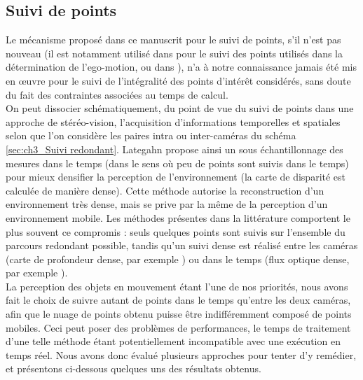 \subsection{Suivi de points} \label{sec:ch3_Implémentation}
Le mécanisme proposé dans ce manuscrit pour le suivi de points, s'il n'est pas nouveau (il est notamment utilisé dans \cite{Lategahn2011} pour le suivi des points utilisés dans la détermination de l'ego-motion, ou dans \cite{Lenz2011}), n'a à notre connaissance jamais été mis en œuvre pour le suivi de l'intégralité des points d'intérêt considérés, sans doute du fait des contraintes associées au temps de calcul.\\
On peut dissocier schématiquement, du point de vue du suivi de points dans une approche de stéréo-vision, l'acquisition d'informations temporelles et spatiales selon que l'on considère les paires intra ou inter-caméras du schéma \ref{sec:ch3_Suivi redondant}. Lategahn propose ainsi un sous échantillonnage des mesures dans le temps (dans le sens où peu de points sont suivis dans le temps) pour mieux densifier la perception de l'environnement (la carte de disparité est calculée de manière dense). Cette méthode autorise la reconstruction d'un environnement très dense, mais se prive par la même de la perception d'un environnement mobile. Les méthodes présentes dans la littérature comportent le plus souvent ce compromis : seuls quelques points sont suivis sur l'ensemble du parcours redondant possible, tandis qu'un suivi dense est réalisé entre les caméras (carte de profondeur dense, par exemple \cite{Agrawal2007}) ou dans le temps (flux optique dense, par exemple \cite{Dumortier}).\\
La perception des objets en mouvement étant l'une de nos priorités, nous avons fait le choix de suivre autant de points dans le temps qu'entre les deux caméras, afin que le nuage de points obtenu puisse être indifféremment composé de points mobiles. Ceci peut poser des problèmes de performances, le temps de traitement d'une telle méthode étant potentiellement incompatible avec une exécution en temps réel. Nous avons donc évalué plusieurs approches pour tenter d'y remédier, et présentons ci-dessous quelques uns des résultats obtenus.

